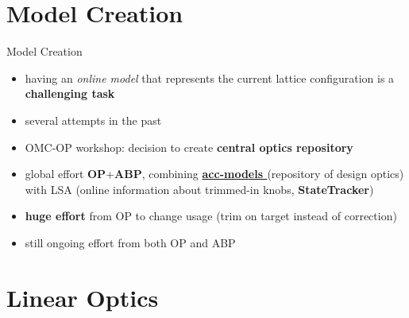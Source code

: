 \documentclass[4pt,usenames,dvipsnames,aspectratio=169,table]{beamer}
\newcommand{\highl}[1]{\textbf{#1}}
\begin{document}
\section{Model Creation}


\begin{frame}{Model Creation}

\begin{itemize}
    \item having an \emph{online model} that represents the current lattice configuration is a \highl{challenging task}
    \item several attempts in the past
    \item OMC-OP workshop: decision to create \highl{central optics repository}
    \item  global effort \highl{OP}+\highl{ABP}, combining \highl{\href{https://gitlab.cern.ch/acc-models}{acc-models \faExternalLink*}} (repository of design optics) with
LSA (online information about trimmed-in knobs, \highl{StateTracker})
    \item \highl{huge effort} from OP to change usage {\footnotesize(trim on target instead of correction)}
    \item still ongoing effort from both OP and ABP
\end{itemize}

\end{frame}


\section{Linear Optics}
\end{document}
